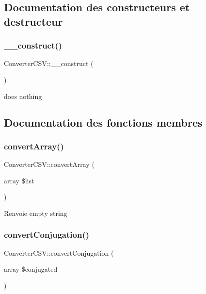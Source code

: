 \subsection{Documentation des constructeurs et destructeur}
\hypertarget{class_converter_c_s_v_ad4fff7f9fd8e69926e394576558776f7}{}\label{class_converter_c_s_v_ad4fff7f9fd8e69926e394576558776f7} 
\subsubsection{\texorpdfstring{\+\_\+\+\_\+construct()}{\_\_construct()}}
{\footnotesize\ttfamily Converter\+C\+S\+V\+::\+\_\+\+\_\+construct (\begin{DoxyParamCaption}{ }\end{DoxyParamCaption})}

does nothing 

\subsection{Documentation des fonctions membres}
\hypertarget{class_converter_c_s_v_a5bf7f48e54520210eeebdc2eb8f9e222}{}\label{class_converter_c_s_v_a5bf7f48e54520210eeebdc2eb8f9e222} 
\subsubsection{\texorpdfstring{convert\+Array()}{convertArray()}}
{\footnotesize\ttfamily Converter\+C\+S\+V\+::convert\+Array (\begin{DoxyParamCaption}\item[{array}]{\$list }\end{DoxyParamCaption})}

\begin{DoxyReturn}{Renvoie}
empty string 
\end{DoxyReturn}
\hypertarget{class_converter_c_s_v_aff168b6953b8c9bdf43280c70e9c7170}{}\label{class_converter_c_s_v_aff168b6953b8c9bdf43280c70e9c7170} 
\subsubsection{\texorpdfstring{convert\+Conjugation()}{convertConjugation()}}
{\footnotesize\ttfamily Converter\+C\+S\+V\+::convert\+Conjugation (\begin{DoxyParamCaption}\item[{array}]{\$conjugated }\end{DoxyParamCaption})}

